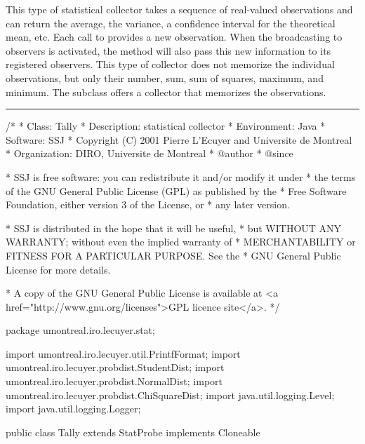 
This type of statistical collector takes a sequence of real-valued
observations and can return the average,
the variance, a confidence interval for the theoretical mean, etc.
Each call to  provides a new observation.
When the broadcasting to observers is activated,
the method  will also pass this new information to its
registered observers.
This type of collector does not memorize the individual observations,
but only their number, sum, sum of squares, maximum, and minimum.
The subclass  offers a collector that memorizes
the observations.

\bigskip\hrule

\begin{code}
\begin{hide}
/*
 * Class:        Tally
 * Description:  statistical collector
 * Environment:  Java
 * Software:     SSJ
 * Copyright (C) 2001  Pierre L'Ecuyer and Universite de Montreal
 * Organization: DIRO, Universite de Montreal
 * @author
 * @since

 * SSJ is free software: you can redistribute it and/or modify it under
 * the terms of the GNU General Public License (GPL) as published by the
 * Free Software Foundation, either version 3 of the License, or
 * any later version.

 * SSJ is distributed in the hope that it will be useful,
 * but WITHOUT ANY WARRANTY; without even the implied warranty of
 * MERCHANTABILITY or FITNESS FOR A PARTICULAR PURPOSE.  See the
 * GNU General Public License for more details.

 * A copy of the GNU General Public License is available at
   <a href="http://www.gnu.org/licenses">GPL licence site</a>.
 */
\end{hide}
package umontreal.iro.lecuyer.stat;
\begin{hide}
import umontreal.iro.lecuyer.util.PrintfFormat;
import umontreal.iro.lecuyer.probdist.StudentDist;
import umontreal.iro.lecuyer.probdist.NormalDist;
import umontreal.iro.lecuyer.probdist.ChiSquareDist;
import java.util.logging.Level;
import java.util.logging.Logger;
\end{hide}

public class Tally extends StatProbe implements Cloneable\begin{hide} {
   private int numObs;
   private double sumSquares;
   private double curAverage;  // The average of the first numObs observations
   private double curSum2;     // The sum (xi - average)^2 of the first numObs
                               // observations.
   private Logger log = Logger.getLogger ("umontreal.iro.lecuyer.stat");

   private static enum CIType {CI_NONE, CI_NORMAL, CI_STUDENT};

   protected CIType confidenceInterval = CIType.CI_NONE;
   protected double level = 0.95;
   protected int digits = 3;
\end{hide}
\end{code}


